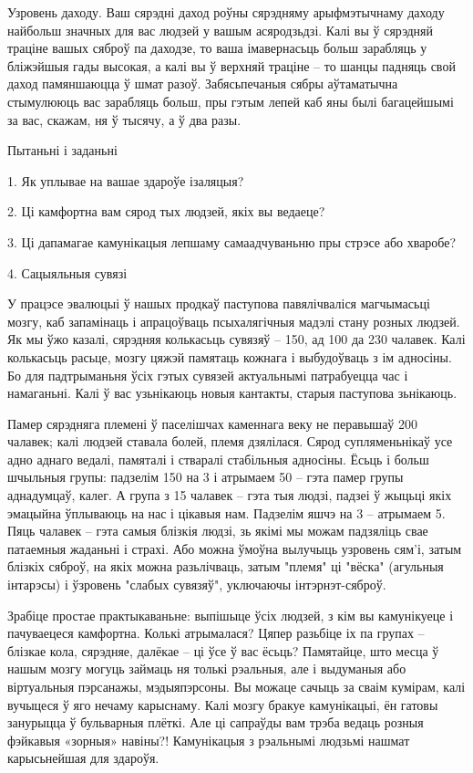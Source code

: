 Узровень даходу. Ваш сярэдні даход роўны сярэдняму арыфмэтычнаму даходу найбольш значных для вас людзей у вашым асяродзьдзі. Калі вы ў сярэдняй траціне вашых сяброў па даходзе, то ваша імавернасьць больш зарабляць у бліжэйшыя гады высокая, а калі вы ў верхняй траціне – то шанцы падняць свой даход памяншаюцца ў шмат разоў. Забясьпечаныя сябры аўтаматычна стымулююць вас зарабляць больш, пры гэтым лепей каб яны былі багацейшымі за вас, скажам, ня ў тысячу, а ў два разы.

Пытаньні і заданьні

1. Як уплывае на вашае здароўе ізаляцыя?

2. Ці камфортна вам сярод тых людзей, якіх вы ведаеце?

3. Ці дапамагае камунікацыя лепшаму самаадчуваньню пры стрэсе або хваробе?


4. Сацыяльныя сувязі

У працэсе эвалюцыі ў нашых продкаў паступова павялічваліся магчымасьці мозгу, каб запамінаць і апрацоўваць псыхалягічныя мадэлі стану розных людзей. Як мы ўжо казалі, сярэдняя колькасьць сувязяў – 150, ад 100 да 230 чалавек. Калі колькасьць расьце, мозгу цяжэй памятаць кожнага і выбудоўваць з ім адносіны. Бо для падтрыманьня ўсіх гэтых сувязей актуальнымі патрабуецца час і намаганьні. Калі ў вас узьнікаюць новыя кантакты, старыя паступова зьнікаюць.

Памер сярэдняга племені ў паселішчах каменнага веку не перавышаў 200 чалавек; калі людзей ставала болей, племя дзялілася. Сярод супляменьнікаў усе адно аднаго ведалі, памяталі і стваралі стабільныя адносіны. Ёсьць і больш шчыльныя групы: падзелім 150 на 3 і атрымаем 50 – гэта памер групы аднадумцаў, калег. А група з 15 чалавек – гэта тыя людзі, падзеі ў жыцьці якіх эмацыйна ўплываюць на нас і цікавыя нам. Падзелім яшчэ на 3 – атрымаем 5. Пяць чалавек – гэта самыя блізкія людзі, зь якімі мы можам падзяліць свае патаемныя жаданьні і страхі. Або можна ўмоўна вылучыць узровень сям'і, затым блізкіх сяброў, на якіх можна разьлічваць, затым "племя" ці "вёска" (агульныя інтарэсы) і ўзровень "слабых сувязяў", уключаючы інтэрнэт-сяброў.

Зрабіце простае практыкаваньне: выпішыце ўсіх людзей, з кім вы камунікуеце і пачуваецеся камфортна. Колькі атрымалася? Цяпер разьбіце іх па групах – блізкае кола, сярэдняе, далёкае – ці ўсе ў вас ёсьць? Памятайце, што месца ў нашым мозгу могуць займаць ня толькі рэальныя, але і выдуманыя або віртуальныя пэрсанажы, мэдыяпэрсоны. Вы можаце сачыць за сваім кумірам, калі вучыцеся ў яго нечаму карыснаму. Калі мозгу бракуе камунікацыі, ён гатовы занурыцца ў бульварныя плёткі. Але ці сапраўды вам трэба ведаць розныя фэйкавыя «зорныя» навіны?! Камунікацыя з рэальнымі людзьмі нашмат карысьнейшая для здароўя.

